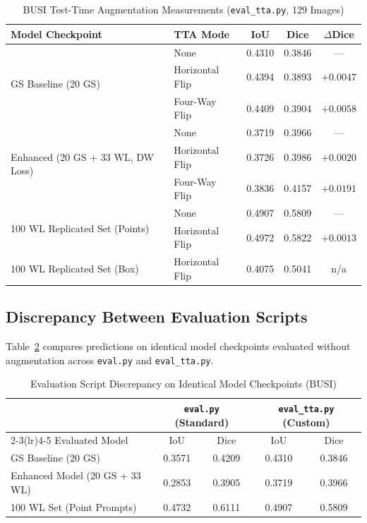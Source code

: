 \documentclass[journal,11pt,onecolumn,draftclsnofoot]{IEEEtran}
\begin{document}
\begin{table}[t]
\renewcommand{\arraystretch}{1.15}
\caption{BUSI Test-Time Augmentation Measurements (\texttt{eval\_tta.py}, 129 Images)}
\label{tab:tta}
\centering\footnotesize
\begin{tabular}{@{}llccc@{}}
\toprule
Model Checkpoint & TTA Mode & IoU & Dice & $\Delta$Dice \\
\midrule
\multirow{3}{*}{GS Baseline (20 GS)} & None & 0.4310 & 0.3846 & --- \\
 & Horizontal Flip & 0.4394 & 0.3893 & $+0.0047$ \\
 & Four-Way Flip & 0.4409 & 0.3904 & $+0.0058$ \\
\midrule
\multirow{3}{*}{Enhanced (20 GS + 33 WL, DW Loss)} & None & 0.3719 & 0.3966 & --- \\
 & Horizontal Flip & 0.3726 & 0.3986 & $+0.0020$ \\
 & Four-Way Flip & 0.3836 & 0.4157 & $+0.0191$ \\
\midrule
\multirow{2}{*}{100 WL Replicated Set (Points)} & None & 0.4907 & 0.5809 & --- \\
 & Horizontal Flip & 0.4972 & 0.5822 & $+0.0013$ \\
\midrule
100 WL Replicated Set (Box) & Horizontal Flip & 0.4075 & 0.5041 & n/a \\
\bottomrule
\end{tabular}
\end{table}

\subsection{Discrepancy Between Evaluation Scripts}
Table~\ref{tab:protocol} compares predictions on identical model checkpoints evaluated without augmentation across \texttt{eval.py} and \texttt{eval\_tta.py}.

\begin{table}[t]
\renewcommand{\arraystretch}{1.15}
\caption{Evaluation Script Discrepancy on Identical Model Checkpoints (BUSI)}
\label{tab:protocol}
\centering\footnotesize
\begin{tabular}{@{}lcccc@{}}
\toprule
 & \multicolumn{2}{c}{\texttt{eval.py} (Standard)} & \multicolumn{2}{c}{\texttt{eval\_tta.py} (Custom)} \\
\cmidrule(lr){2-3}\cmidrule(lr){4-5}
Evaluated Model & IoU & Dice & IoU & Dice \\
\midrule
GS Baseline (20 GS) & 0.3571 & 0.4209 & 0.4310 & 0.3846 \\
Enhanced Model (20 GS + 33 WL) & 0.2853 & 0.3905 & 0.3719 & 0.3966 \\
100 WL Set (Point Prompts) & 0.4732 & 0.6111 & 0.4907 & 0.5809 \\
\bottomrule
\end{tabular}
\end{table}
\end{document}

